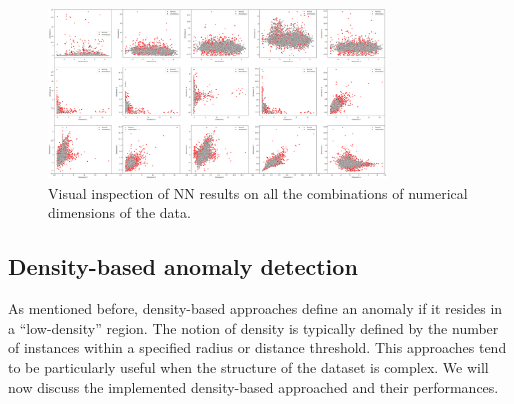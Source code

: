 \documentclass[9pt,twocolumn]{article}
\begin{document}
 \begin{figure}[h]
    \centering
    \includegraphics[width=0.80\textwidth]{images/NN_floatdims.png}
    \caption{Visual inspection of NN results on all the combinations of numerical dimensions of the data.}
    \label{fig:nn_alldims}
 \end{figure}

\subsection{Density-based anomaly detection}
As mentioned before, density-based approaches define an anomaly if it resides in a ``low-density'' region. The notion of density is typically defined by the number of instances within a specified radius or distance threshold. This approaches tend to be particularly useful when the structure of the dataset is complex. We will now discuss the implemented density-based approached and their performances.
\end{document}
